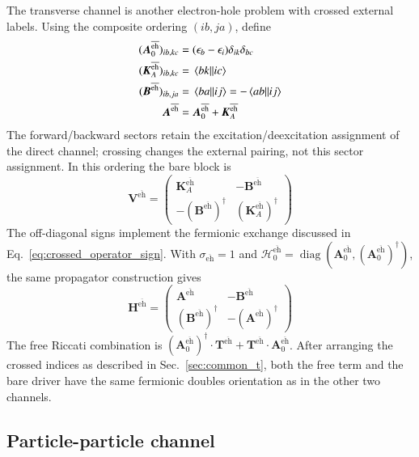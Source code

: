 \documentclass[aip,jcp,reprint,noshowkeys,superscriptaddress]{revtex4-1}
\newcommand{\teh}{{\overline{\text{eh}}}}
\newcommand{\bT}{\boldsymbol{T}}
\newcommand{\bA}{\boldsymbol{A}}
\newcommand{\bB}{\boldsymbol{B}}
\newcommand{\bH}{\boldsymbol{H}}
\newcommand{\bK}{\boldsymbol{K}}
\newcommand{\bV}{\boldsymbol{V}}
\newcommand{\bcalH}{\boldsymbol{\mathcal{H}}}
\begin{document}
The transverse channel is another electron-hole problem with crossed
external labels. Using the composite ordering $(ib,ja)$, define
\begin{align}
    (\bA_0^{\teh})_{ib,kc}
    &=(\epsilon_b-\epsilon_i)\delta_{ik}\delta_{bc}
    \\
    (\bK_A^{\teh})_{ib,kc}
    &=\mel{bk}{}{ic}
    \\
    (\bB^{\teh})_{ib,ja}
    &=\mel{ba}{}{ij}
    =-\mel{ab}{}{ij}
    \\
    \bA^{\teh}
    &=\bA_0^{\teh}+\bK_A^{\teh}
\end{align}
The forward/backward sectors retain the excitation/deexcitation assignment
of the direct channel; crossing changes the external pairing, not this
sector assignment. In this ordering the bare block is
\begin{equation}
 \bV^{\teh}=\begin{pmatrix}
 \bK_A^{\teh}&-\bB^{\teh}\\
 -(\bB^{\teh})^{\dagger}&(\bK_A^{\teh})^{\dagger}
 \end{pmatrix}
 \label{eq:bare_static_teh_block}
\end{equation}
The off-diagonal signs implement the fermionic exchange discussed in
Eq.~\eqref{eq:crossed_operator_sign}. With $\sigma_{\teh}=1$ and
$\bcalH_0^{\teh}=\operatorname{diag}(\bA_0^{\teh},
(\bA_0^{\teh})^{\dagger})$, the same propagator construction gives
\begin{equation}
    \bH^{\teh}
    =
    \begin{pmatrix}
        \bA^{\teh}&-\bB^{\teh}\\
        (\bB^{\teh})^{\dagger}&-(\bA^{\teh})^{\dagger}
    \end{pmatrix}
    \label{eq:H_teh_from_crossing}
\end{equation}
The free Riccati combination is
$(\bA_0^{\teh})^{\dagger}\cdot\bT^{\teh}
+\bT^{\teh}\cdot \bA_0^{\teh}$. After arranging the crossed indices as
described in Sec.~\ref{sec:common_t}, both the free term and the bare driver
have the same fermionic doubles orientation as in the other two channels.

\subsection{Particle-particle channel}
\end{document}
